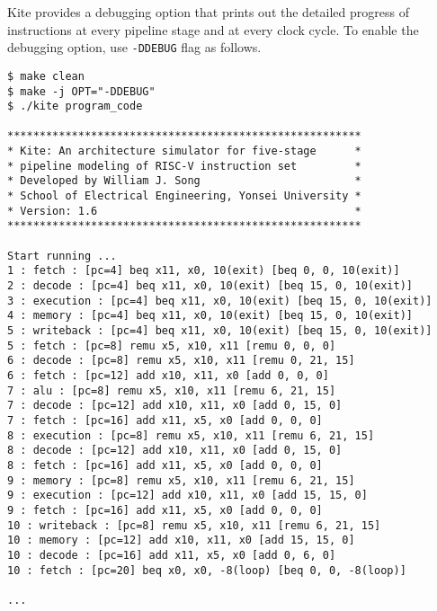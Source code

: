 \documentclass[10pt]{article}
\begin{document}
Kite provides a debugging option that prints out the detailed progress of instructions at every pipeline stage and at every clock cycle.
To enable the debugging option, use {\tt -DDEBUG} flag as follows.
\begin{Verbatim}[frame=single,fontsize=\small]
$ make clean
$ make -j OPT="-DDEBUG" 
$ ./kite program_code

*******************************************************
* Kite: An architecture simulator for five-stage      *
* pipeline modeling of RISC-V instruction set         *
* Developed by William J. Song                        *
* School of Electrical Engineering, Yonsei University *
* Version: 1.6                                        *
*******************************************************

Start running ...
1 : fetch : [pc=4] beq x11, x0, 10(exit) [beq 0, 0, 10(exit)]
2 : decode : [pc=4] beq x11, x0, 10(exit) [beq 15, 0, 10(exit)]
3 : execution : [pc=4] beq x11, x0, 10(exit) [beq 15, 0, 10(exit)]
4 : memory : [pc=4] beq x11, x0, 10(exit) [beq 15, 0, 10(exit)]
5 : writeback : [pc=4] beq x11, x0, 10(exit) [beq 15, 0, 10(exit)]
5 : fetch : [pc=8] remu x5, x10, x11 [remu 0, 0, 0]
6 : decode : [pc=8] remu x5, x10, x11 [remu 0, 21, 15]
6 : fetch : [pc=12] add x10, x11, x0 [add 0, 0, 0]
7 : alu : [pc=8] remu x5, x10, x11 [remu 6, 21, 15]
7 : decode : [pc=12] add x10, x11, x0 [add 0, 15, 0]
7 : fetch : [pc=16] add x11, x5, x0 [add 0, 0, 0]
8 : execution : [pc=8] remu x5, x10, x11 [remu 6, 21, 15]
8 : decode : [pc=12] add x10, x11, x0 [add 0, 15, 0]
8 : fetch : [pc=16] add x11, x5, x0 [add 0, 0, 0]
9 : memory : [pc=8] remu x5, x10, x11 [remu 6, 21, 15]
9 : execution : [pc=12] add x10, x11, x0 [add 15, 15, 0]
9 : fetch : [pc=16] add x11, x5, x0 [add 0, 0, 0]
10 : writeback : [pc=8] remu x5, x10, x11 [remu 6, 21, 15]
10 : memory : [pc=12] add x10, x11, x0 [add 15, 15, 0]
10 : decode : [pc=16] add x11, x5, x0 [add 0, 6, 0]
10 : fetch : [pc=20] beq x0, x0, -8(loop) [beq 0, 0, -8(loop)]

...
\end{Verbatim}
\end{document}
